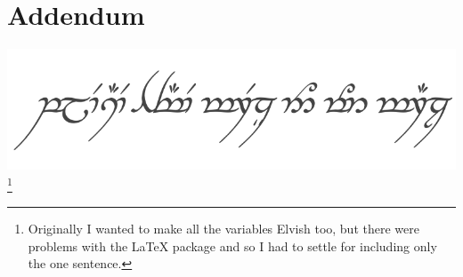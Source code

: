 \documentclass[letter]{article}
\begin{document}
\section{Addendum}
\includegraphics{ElvishPlea}\footnote{Originally I wanted to make all the variables Elvish too, but there were problems with the \LaTeX{} package and so I had to settle for including only the one sentence.}
\end{document}
